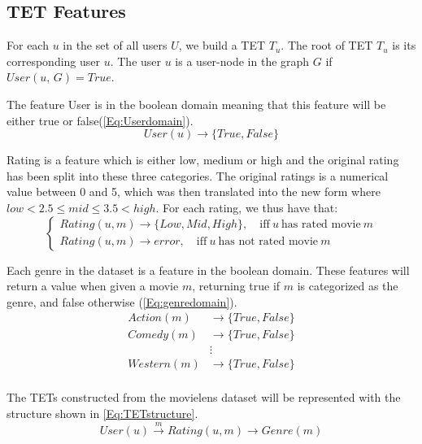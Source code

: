 \subsection{TET Features}


For each $u$ in the set of all users $U$, we build a TET $T_u$. The root of TET $T_u$ is its corresponding user $u$.
The user $u$ is a user-node in the graph $G$ if $User(u, \, G) = True$.

The feature User is in the boolean domain meaning that this feature will be either true or false(\autoref{Eq:Userdomain}).
\begin{equation}\label{Eq:Userdomain}
  User(u)\rightarrow \{True, False\}
\end{equation}


Rating is a feature which is either low, medium or high and the original rating has been split into these three categories.
The original ratings is a numerical value between 0 and 5, which was then translated into the new form where $low<2.5\leq mid \leq 3.5<high$.
For each rating, we thus have that:
\begin{equation}\label{Eq:Ratingdomain}
  \begin{cases}
    Rating(u, m) \rightarrow \{Low, Mid, High\}, \quad \text{iff} \ u \ \text{has rated movie} \ m \\
    Rating(u, m) \rightarrow error, \quad \text{iff} \ u \ \text{has not rated movie} \ m

  \end{cases}
\end{equation}

Each genre in the dataset is a feature in the boolean domain. These features will return a value when given a movie $m$, returning true if $m$ is categorized as the genre, and false otherwise (\autoref{Eq:genredomain}).
\begin{equation}\label{Eq:genredomain}
\begin{aligned}
Action(m)& \rightarrow \{True, False\} \\
Comedy(m)& \rightarrow \{True, False\} \\
&\vdots \\
Western(m)& \rightarrow \{True, False\} \\
\end{aligned}
\end{equation}

The TETs constructed from the movielens dataset will be represented with the structure shown in \autoref{Eq:TETstructure}.
\begin{equation}\label{Eq:TETstructure}
User(u) \stackrel{m}{\longrightarrow} Rating(u,m) \longrightarrow Genre(m)
\end{equation}

